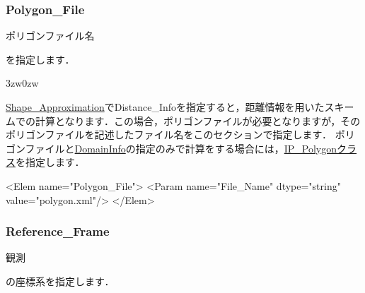 
\pagebreak
\subsubsection{Polygon\_File}
\hypertarget{tgt:poly_file_name}{ポリゴンファイル名}を指定します．

\begin{indentation}{3zw}{0zw}
\small

\hyperlink{tgt:solver_property}{Shape\_Approximation}でDistance\_Infoを指定すると，距離情報を用いたスキームでの計算となります．この場合，ポリゴンファイルが必要となりますが，そのポリゴンファイルを記述したファイル名をこのセクションで指定します．
ポリゴンファイルと\hyperlink{tgt:domaininfo}{DomainInfo}の指定のみで計算をする場合には，\hyperlink{tgt:polygon_class}{IP\_Polygonクラス}を指定します．

\begin{program}
<Elem name="Polygon_File">
  <Param name="File_Name" dtype="string" value="polygon.xml"/>
</Elem>
\end{program}

\end{indentation}

\pagebreak
\subsubsection{Reference\_Frame}

\hypertarget{tgt:reference_frame}{観測}の座標系を指定します．

